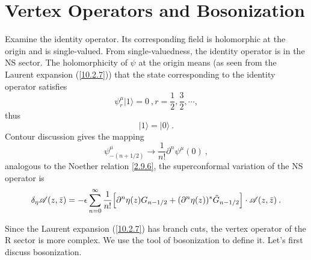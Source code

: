 	\section{Vertex Operators and Bosonization}
	
	Examine the identity operator. Its corresponding field is holomorphic at the origin and is single-valued. From single-valuedness, the identity operator is in the NS sector. The holomorphicity of $\psi$ at the origin means (as seen from the Laurent expansion (\ref{10.2.7})) that the state corresponding to the identity operator satisfies
	\begin{equation}
		\psi_{r}^{\mu} \lvert 1\rangle =0 \:, r=\frac{1}{2},\frac{3}{2},\cdots, \label{10.3.1}
	\end{equation}
	thus
	\begin{equation}
		\lvert 1\rangle =\lvert 0\rangle \:. \label{10.3.2}
	\end{equation}
	Contour discussion gives the mapping
	\begin{equation}
		\psi_{-(n+1/2)}^{\mu} \to \frac{1}{n!}\partial^{n}\psi^{\mu}(0)\:, \label{10.3.3}
	\end{equation}
	analogous to the Noether relation \eqref{2.9.6}, the superconformal variation of the NS operator is
	\begin{equation}
		\delta_{\eta}\mathscr{A}(z,\bar{z})=-\epsilon \sum_{n=0}^{\infty}\frac{1}{n!}
		\Bigl[\partial^{n}\eta(z)G_{n-1/2}+(\partial^{n}\eta(z))^{\ast}\tilde{G}_{n-1/2}\Bigr]\cdot \mathscr{A}(z,\bar{z})\:. \label{10.3.4}
	\end{equation}
	
	Since the Laurent expansion (\ref{10.2.7}) has branch cuts, the vertex operator of the R sector is more complex. We use the tool of bosonization to define it. Let's first discuss bosonization.
	
